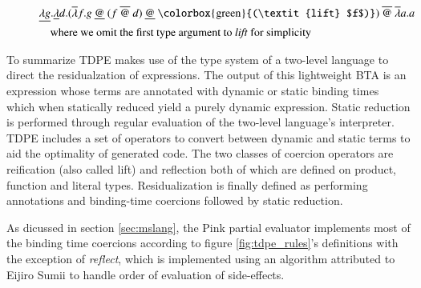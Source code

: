 \documentclass[a4paper,12pt,twoside,openright]{report}
\theoremstyle{definition}
\begin{document}
\begin{figure}[htp!]
    \begin{align}
        & \underline{\lambda g}.\underline{\lambda} d.(\overline{\lambda}f.g \: \underline{@} \: (f \: \overline{@} \: d) \: \underline{@} \: \text{\colorbox{green}{(\textit{lift} $f$)}}) \: \overline{@} \: \overline{\lambda} a.a \label{eq:tdpe_ex4} \\
        & \quad \text{where we omit the first type argument to \textit{lift} for simplicity} \nonumber
    \end{align}
\end{figure}


To summarize TDPE makes use of the type system of a two-level language to direct the residualzation of expressions. The output of this lightweight BTA is an expression whose terms are annotated with dynamic or static binding times which when statically reduced yield a purely dynamic expression. Static reduction is performed through regular evaluation of the two-level language's interpreter. TDPE includes a set of operators to convert between dynamic and static terms to aid the optimality of generated code. The two classes of coercion operators are reification (also called lift) and reflection both of which are defined on product, function and literal types. Residualization is finally defined as performing annotations and binding-time coercions followed by static reduction.

As dicussed in section \ref{sec:mslang}, the Pink \cite{amin2017collapsing} partial evaluator implements most of the binding time coercions according to figure \ref{fig:tdpe_rules}'s definitions with the exception of \textit{reflect}, which is implemented using an algorithm attributed to Eijiro Sumii \cite{hatcliff2007partial} to handle order of evaluation of side-effects.
\end{document}
